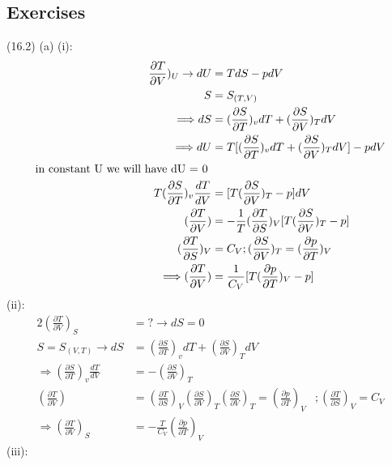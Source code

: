 \begin{latin}
    \section*{Exercises}
    (16.2) (a) (i):\\
   
    \begin{alignat*}{2}
        \frac{\partial T}{\partial V})_U \to dU &= TdS - pdV\\
        S &= S_{(T,V)}\\
        \Longrightarrow dS &= (\frac{\partial S}{\partial T})_v dT + (\frac{\partial S}{\partial V})_T dV\\
        \Longrightarrow dU &= T[(\frac{\partial S}{\partial T})_v dT + (\frac{\partial S}{\partial V})_T dV] - pdV\\
        \textmd{in constant U we will have dU = 0 }\\
        T(\frac{\partial S}{\partial T})_v \frac{dT}{dV} &= [T(\frac{\partial S}{\partial V})_T  -p]dV\\
        (\frac{\partial T}{\partial V}) &= -\frac{1}{T}(\frac{\partial T}{\partial S})_V [T(\frac{\partial S}{\partial V})_T  -p]\\
        (\frac{\partial T}{\partial S})_V &= C_V ; (\frac{\partial S}{\partial V})_T = (\frac{\partial p}{\partial T})_V \\
        \Longrightarrow  (\frac{\partial T}{\partial V}) &= \frac{1}{C_V}  [T(\frac{\partial p}{\partial T})_V -p]\\
    \end{alignat*}
    (ii):
    \begin{alignat*}{2}
        (\frac{\partial T}{\partial V})_S &= ? \to dS = 0\\
        S = S_(V,T) \to dS &= (\frac{\partial S}{\partial T})_v dT + (\frac{\partial S}{\partial V})_T dV \\
        \Longrightarrow (\frac{\partial S}{\partial T})_v \frac{dT}{dV} &= - (\frac{\partial S}{\partial V})_T\\
        (\frac{\partial T}{\partial V}) &= (\frac{\partial T}{\partial S})_V (\frac{\partial S}{\partial V})_T
        (\frac{\partial S}{\partial V})_T =(\frac{\partial p}{\partial T})_V &; (\frac{\partial T}{\partial S})_V = C_V \\
        \Longrightarrow (\frac{\partial T}{\partial V})_S &= -\frac{T}{C_V}(\frac{\partial p}{\partial T})_V 
    \end{alignat*}
    (iii):

\end{latin}

